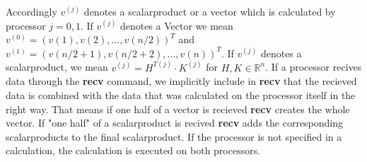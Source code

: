 \documentclass{article}
\begin{document}
\begin{enumerate}[label=(\alph*)]
Accordingly $v^{(j)}$ denotes a scalarproduct or a vector which is calculated by processor $j = 0, 1$. 
If $v^{(j)}$ denotes a Vector we mean $v^{(0)} = (v(1), v(2), ..., v(n/2))^T$ and $v^{(1)} = (v(n/2+1), v(n/2+2), ..., v(n))^T$.
If $v^{(j)}$ denotes a scalarproduct, we mean $v^{(j)} = H^{T(j)} \cdot K^{(j)}$ for $H, K \in \mathbb{R}^n$.
If a processor recives data through the \textbf{recv} command, we implicitly include in \textbf{recv} that the recieved data is combined with the data that was calculated on the processor itself in the right way. That means if one half of a vector is recieved \textbf{recv} creates the whole vector. If "one half" of a scalarproduct is recived \textbf{recv} adds the corresponding scalarproducts to the final scalarproduct.
If the processor is not specified in a calculation, the calculation is executed on both processors.
\end{enumerate} 
\end{document}
